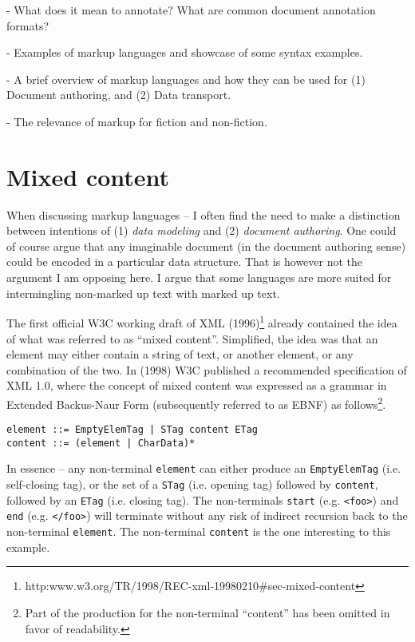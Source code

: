 \documentclass{scrreprt}
\begin{document}
- What does it mean to annotate? What are common document annotation formats?

- Examples of markup languages and showcase of some syntax examples.

- A brief overview of markup languages and how they can be used for (1) Document authoring, and (2) Data transport.

- The relevance of markup for fiction and non-fiction.



\section{Mixed content}
When discussing markup languages -- I often find the need to make a distinction between intentions of (1) \emph{data modeling} and (2) \emph{document authoring}. One could of course argue that any imaginable document (in the document authoring sense) could be encoded in a particular data structure. That is however not the argument I am opposing here. I argue that some languages are more suited for intermingling non-marked up text with marked up text.


The first official W3C working draft of XML (1996)\footnote{http:\/\/www.w3.org/TR/1998/REC-xml-19980210\#sec-mixed-content} already contained the idea of what was referred to as ``mixed content''. Simplified, the idea was that an element may either contain a string of text, or another element, or any combination of the two. In (1998) W3C published a recommended specification of XML 1.0, where the concept of mixed content was expressed as a grammar in Extended Backus-Naur Form (subsequently referred to as EBNF) as follows\footnote{Part of the production for the non-terminal ``content'' has been omitted in favor of readability.}.

\begin{lstlisting}
element ::= EmptyElemTag | STag content ETag 
content ::= (element | CharData)*
\end{lstlisting}

In essence -- any non-terminal \texttt{element} can either produce an \texttt{EmptyElemTag} (i.e. self-closing tag), or the set of a \texttt{STag} (i.e. opening tag) followed by \texttt{content}, followed by an \texttt{ETag} (i.e. closing tag). The non-terminals \texttt{start} (e.g. \texttt{<foo>}) and \texttt{end} (e.g. \texttt{</foo>}) will terminate without any risk of indirect recursion back to the non-terminal \texttt{element}. The non-terminal \texttt{content} is the one interesting to this example.
\end{document}
